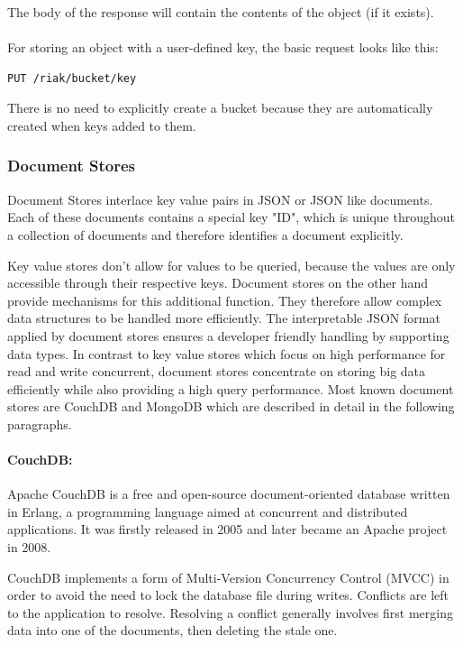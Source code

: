 The body of the response will contain the contents of the object (if it exists).
\\
\\
For storing an object with a user-defined key, the basic request looks like this:

\begin{code}
\begin{verbatim}
PUT /riak/bucket/key
\end{verbatim}
\label{lst:riak_get}
\end{code}

There is no need to explicitly create a bucket because they are automatically created when keys added to them.


\subsubsection{Document Stores}
Document Stores interlace key value pairs in JSON or JSON like documents. Each of these documents contains a special key "ID", which is unique throughout a collection of documents and therefore identifies a document explicitly. 

Key value stores don't allow for values to be queried, because the values are only accessible through their respective keys. Document stores on the other hand provide mechanisms for this additional function. They therefore allow complex data structures to be handled more efficiently. The interpretable JSON format applied by document stores ensures a developer friendly handling by supporting data types. In contrast to key value stores which focus on high performance for read and write concurrent, document stores concentrate on storing big data efficiently while also providing a high query performance. Most known document stores are CouchDB and MongoDB  which are described in detail in the following paragraphs.

\paragraph{CouchDB:} Apache CouchDB is a free and open-source document-oriented database written in Erlang, a programming language aimed at concurrent and distributed applications. It was firstly released in 2005 and later became an Apache project in 2008.

CouchDB implements a form of Multi-Version Concurrency Control (MVCC) in order to avoid the need to lock the database file during writes. Conflicts are left to the application to resolve. Resolving a conflict generally involves first merging data into one of the documents, then deleting the stale one.

